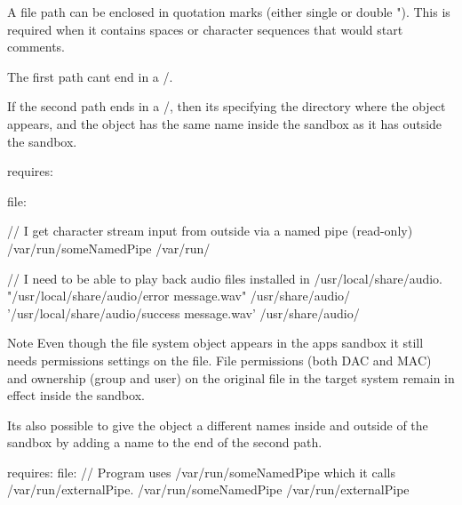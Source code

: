 A file path can be enclosed in quotation marks (either single \textquotesingle{} or double "). This is required when it contains spaces or character sequences that would start comments.

The first path can\textquotesingle{}t end in a \textquotesingle{}/\textquotesingle{}.

If the second path ends in a \textquotesingle{}/\textquotesingle{}, then it\textquotesingle{}s specifying the directory where the object appears, and the object has the same name inside the sandbox as it has outside the sandbox.

\begin{DoxyVerb}requires:
{
    file:
    {
        // I get character stream input from outside via a named pipe (read-only)
        /var/run/someNamedPipe  /var/run/

        // I need to be able to play back audio files installed in /usr/local/share/audio.
        "/usr/local/share/audio/error message.wav" /usr/share/audio/
        '/usr/local/share/audio/success message.wav' /usr/share/audio/
    }
}
\end{DoxyVerb}


\begin{DoxyNote}{Note}
Even though the file system object appears in the app\textquotesingle{}s sandbox it still needs permissions settings on the file. File permissions (both D\+A\+C and M\+A\+C) and ownership (group and user) on the original file in the target system remain in effect inside the sandbox.
\end{DoxyNote}
It\textquotesingle{}s also possible to give the object a different names inside and outside of the sandbox by adding a name to the end of the second path.

\begin{DoxyVerb}requires:
{
    file:
    {
        // Program uses /var/run/someNamedPipe which it calls /var/run/externalPipe.
        /var/run/someNamedPipe  /var/run/externalPipe
    }
}
\end{DoxyVerb}


